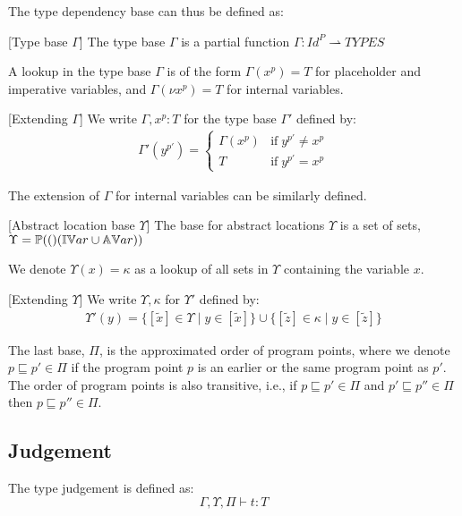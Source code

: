 \documentclass[../../master.tex]{subfiles}
\begin{document}
The type dependency base can thus be defined as:
\begin{definition}{[Type base $\Gamma$]}
	The type base $\Gamma$ is a partial function $\Gamma:Id^P\rightharpoonup TYPES$
\end{definition}

A lookup in the type base $\Gamma$ is of the form $\Gamma(x^p)=T$ for placeholder and imperative variables, and $\Gamma(\nu x^p)=T$ for internal variables.

\begin{definition}{[Extending $\Gamma$]}
	We write $\Gamma,x^p:T$ for the type base $\Gamma'$ defined by:
	\begin{align*}
		\Gamma'(y^{p'})=
		\left\{\begin{matrix}
			\Gamma(x^p) & \mbox{if}\;y^{p'} \neq x^{p}\\ 
			T & \mbox{if}\;y^{p'} = x^{p}
		\end{matrix}\right.
	\end{align*}
\end{definition}
The extension of $\Gamma$ for internal variables can be similarly defined.
\bigskip

\begin{definition}{[Abstract location base $\Upsilon$]}
	The base for abstract locations $\Upsilon$ is a set of sets, $\Upsilon=\mathbb{P}(()(\mathbb{IV}ar\cup\mathbb{AV}ar))$
\end{definition}
We denote $\Upsilon(x)=\kappa$ as a lookup of all sets in $\Upsilon$ containing the variable $x$.

\begin{definition}{[Extending $\Upsilon$]}
	We write $\Upsilon,\kappa$ for $\Upsilon'$ defined by:
	\begin{align*}
		\Upsilon'(y)=\{[\tilde{x}]\in\Upsilon \mid y\in[\tilde{x}]\} \cup \{[\tilde{z}]\in\kappa \mid y\in[\tilde{z}]\}
	\end{align*}
\end{definition}
\bigskip

The last base, $\Pi$, is the approximated order of program points, where we denote $p\sqsubseteq p'\in\Pi$ if the program point $p$ is an earlier or the same program point as $p'$.
The order of program points is also transitive, i.e., if $p\sqsubseteq p'\in\Pi$ and $p'\sqsubseteq p''\in\Pi$ then $p\sqsubseteq p''\in\Pi$.


\subsection{Judgement}
The type judgement is defined as:
$$\Gamma,\Upsilon,\Pi\vdash t: T$$
\end{document}
